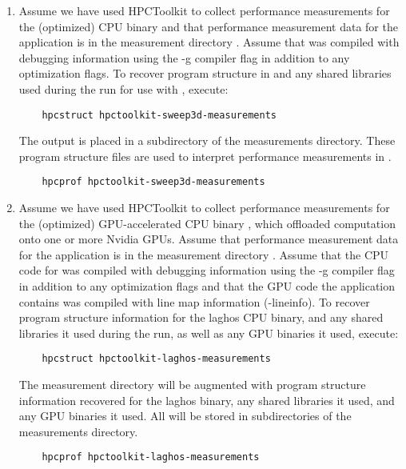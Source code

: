 \documentclass[english]{article}
\begin{document}
\begin{enumerate}
\item
Assume we have used HPCToolkit to collect performance measurements for the (optimized) CPU binary
 and that performance measurement data for the application is in the measurement
directory .
Assume that  was compiled with debugging information using the -g compiler flag in addition to any
optimization flags.
To recover program structure in  and any shared libraries used during the run
for use with , execute:
\medskip
\begin{verbatim}
    hpcstruct hpctoolkit-sweep3d-measurements
\end{verbatim}
\medskip
The output is placed in a subdirectory of the measurements directory.
\medskip
These program structure files are used to interpret performance measurements in .
\medskip
\begin{verbatim}
    hpcprof hpctoolkit-sweep3d-measurements
\end{verbatim}

\item
Assume we have used HPCToolkit to collect performance measurements for the (optimized) GPU-accelerated
CPU binary , which offloaded computation onto one or more Nvidia GPUs.
Assume that performance measurement data for the application is in the measurement
directory .
\medskip
Assume that the CPU code for  was compiled with debugging information using the -g compiler flag in addition to any
optimization flags and that the GPU code the application contains was compiled with line map information (-lineinfo).
\medskip
To recover program structure information for the laghos CPU binary, and any shared libraries it used
during the run, as well as any GPU binaries it used, execute:
\medskip
\begin{verbatim}
    hpcstruct hpctoolkit-laghos-measurements
\end{verbatim}
\medskip
The measurement directory will be augmented with program structure information recovered for the
laghos binary, any shared libraries it used, and any GPU binaries it used.  All will be
stored in subdirectories of the measurements directory.
\medskip
\begin{verbatim}
    hpcprof hpctoolkit-laghos-measurements
\end{verbatim}
\end{enumerate}
\end{document}
